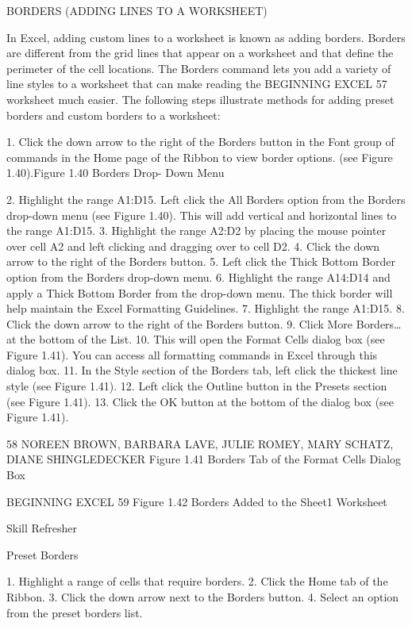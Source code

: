 BORDERS (ADDING LINES TO A WORKSHEET)

In Excel, adding custom lines to a worksheet is known as adding borders. Borders are different from
the grid lines that appear on a worksheet and that define the perimeter of the cell locations. The
Borders command lets you add a variety of line styles to a worksheet that can make reading the
BEGINNING EXCEL 57
worksheet much easier. The following steps illustrate methods for adding preset borders and custom
borders to a worksheet:

1. Click the down arrow to the right of the Borders button in the Font group of commands in the
Home page of the Ribbon to view border options. (see Figure 1.40).Figure 1.40 Borders Drop-
Down Menu




2. Highlight the range A1:D15. Left click the All Borders option from the Borders drop-down
menu (see Figure 1.40). This will add vertical and horizontal lines to the range A1:D15.
3. Highlight the range A2:D2 by placing the mouse pointer over cell A2 and left clicking and
dragging over to cell D2.
4. Click the down arrow to the right of the Borders button.
5. Left click the Thick Bottom Border option from the Borders drop-down menu.
6. Highlight the range A14:D14 and apply a Thick Bottom Border from the drop-down menu. The
thick border will help maintain the Excel Formatting Guidelines.
7. Highlight the range A1:D15.
8. Click the down arrow to the right of the Borders button.
9. Click More Borders… at the bottom of the List.
10. This will open the Format Cells dialog box (see Figure 1.41). You can access all formatting
commands in Excel through this dialog box.
11. In the Style section of the Borders tab, left click the thickest line style (see Figure 1.41).
12. Left click the Outline button in the Presets section (see Figure 1.41).
13. Click the OK button at the bottom of the dialog box (see Figure 1.41).


58 NOREEN BROWN, BARBARA LAVE, JULIE ROMEY, MARY SCHATZ, DIANE SHINGLEDECKER
Figure 1.41 Borders Tab of the Format Cells Dialog Box




BEGINNING EXCEL 59
Figure 1.42 Borders Added to the Sheet1 Worksheet




Skill Refresher


Preset Borders

1. Highlight a range of cells that require borders.
2. Click the Home tab of the Ribbon.
3. Click the down arrow next to the Borders button.
4. Select an option from the preset borders list.

